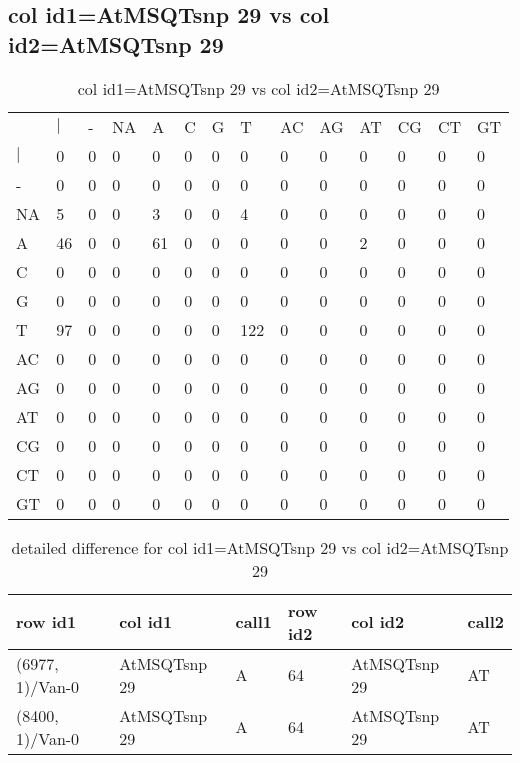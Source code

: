 \subsection{col id1=AtMSQTsnp 29 vs col id2=AtMSQTsnp 29}
\begin{center}
\begin{longtable}{|l|l|l|l|l|l|l|l|l|l|l|l|l|l|}
\caption{col id1=AtMSQTsnp 29 vs col id2=AtMSQTsnp 29} \label{table_dm826}\\
\hline
\\
\hline
&$|$&-&NA&A&C&G&T&AC&AG&AT&CG&CT&GT\\
$|$&0&0&0&0&0&0&0&0&0&0&0&0&0\\
-&0&0&0&0&0&0&0&0&0&0&0&0&0\\
NA&5&0&0&3&0&0&4&0&0&0&0&0&0\\
A&46&0&0&61&0&0&0&0&0&2&0&0&0\\
C&0&0&0&0&0&0&0&0&0&0&0&0&0\\
G&0&0&0&0&0&0&0&0&0&0&0&0&0\\
T&97&0&0&0&0&0&122&0&0&0&0&0&0\\
AC&0&0&0&0&0&0&0&0&0&0&0&0&0\\
AG&0&0&0&0&0&0&0&0&0&0&0&0&0\\
AT&0&0&0&0&0&0&0&0&0&0&0&0&0\\
CG&0&0&0&0&0&0&0&0&0&0&0&0&0\\
CT&0&0&0&0&0&0&0&0&0&0&0&0&0\\
GT&0&0&0&0&0&0&0&0&0&0&0&0&0\\
\hline
\end{longtable}
\end{center}

\begin{center}
\begin{longtable}{|l|l|l|l|l|l|}
\caption{detailed difference for col id1=AtMSQTsnp 29 vs col id2=AtMSQTsnp 29} \label{table_dm827}\\
\hline
row id1&col id1&call1&row id2&col id2&call2\\
\hline
(6977, 1)/Van-0&AtMSQTsnp 29&A&64&AtMSQTsnp 29&AT\\
(8400, 1)/Van-0&AtMSQTsnp 29&A&64&AtMSQTsnp 29&AT\\
\hline
\end{longtable}
\end{center}

